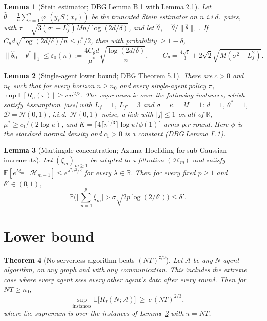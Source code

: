 \documentclass[11pt]{article}
\newtheorem{theorem}{Theorem}
\newtheorem{lemma}[theorem]{Lemma}
\theoremstyle{definition}
\newcommand{\E}{\mathbb{E}}
\newcommand{\Prob}{\mathbb{P}}
\newcommand{\R}{\mathbb{R}}
\newcommand{\eps}{\varepsilon}
\begin{document}
\begin{lemma}[Stein estimator; DBG Lemma B.1 with Lemma 2.1]\label{lem:stein}
Let $\hat\theta=\frac1n\sum_{s=1}^n\varphi_\tau(y_sS(x_s))$ be the truncated Stein estimator on $n$ i.i.d.\ pairs, with
$\tau=\sqrt{3(\sigma^2+L_f^2)Mn/\log(2d/\delta)}$, and let $\hat\theta_0=\hat\theta/\|\hat\theta\|_1$. If
$C_\theta d\sqrt{\log(2d/\delta)/n}\le\mu^*/2$, then with probability $\ge1-\delta$,
\[
\|\hat\theta_0-\theta^*\|_1\le\eps_0(n):=\frac{4C_\theta d}{\mu^*}\sqrt{\frac{\log(2d/\delta)}{n}},
\qquad C_\theta=\tfrac{4\sqrt3}{3}+2\sqrt2\sqrt{M(\sigma^2+L_f^2)}.
\]
\end{lemma}

\begin{lemma}[Single-agent lower bound; DBG Theorem 5.1]\label{lem:dbglower}
There are $c>0$ and $n_0$ such that for every horizon $n\ge n_0$ and every single-agent policy $\pi$,
$\sup\E[R_n(\pi)]\ge c\,n^{2/3}$. The supremum is over the following instances, which satisfy Assumption~\ref{ass}
with $L_f=1$, $L_{f'}=3$ and $\sigma=\kappa=M=1$: $d=1$, $\theta^*=1$, $\mathcal D=\mathcal N(0,1)$, i.i.d.\
$\mathcal N(0,1)$ noise, a link with $|f|\le1$ on all of $\R$, $\mu^*\ge c_1/(2\log n)$, and
$K=\lceil 4\lceil n^{1/3}\rceil\log n/\phi(1)\rceil$ arms per round. Here $\phi$ is the standard normal density and
$c_1>0$ is a constant (DBG Lemma F.1).
\end{lemma}

\begin{lemma}[Martingale concentration; Azuma--Hoeffding for sub-Gaussian increments]\label{lem:azuma}
Let $(\xi_m)_{m\ge1}$ be adapted to a filtration $(\mathcal H_m)$ and satisfy
$\E[e^{\lambda\xi_m}\mid\mathcal H_{m-1}]\le e^{\lambda^2\sigma^2/2}$ for every $\lambda\in\R$. Then for every fixed $p\ge1$ and
$\delta'\in(0,1)$,
\[
\Prob\Big(\Big|\sum_{m=1}^p\xi_m\Big|>\sigma\sqrt{2p\log(2/\delta')}\Big)\le\delta'.
\]
\end{lemma}

\section{Lower bound}\label{sec:lower}

\begin{theorem}[No serverless algorithm beats $(NT)^{2/3}$]\label{thm:lower}
Let $\mathcal A$ be any $N$-agent algorithm, on any graph and with any communication. This includes the extreme case
where every agent sees every other agent's data after every round. Then for $NT\ge n_0$,
\[
\sup_{\text{instances}}\E\big[R_T(N;\mathcal A)\big]\ \ge\ c\,(NT)^{2/3},
\]
where the supremum is over the instances of Lemma~\ref{lem:dbglower} with $n=NT$.
\end{theorem}
\end{document}
